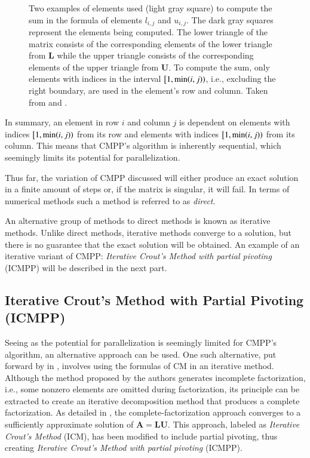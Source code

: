 \begin{figure}[ht!]
\begin{subfigure}{.5\textwidth}
		\label{Figure:theory->ICMPP->LUP->CMPP->sum-in-element-computation-dependance-U}
	\end{subfigure}
	\caption{Two examples of elements used (light gray square) to compute the sum in the formula of elements $l_{i,j}$ and $u_{i,j}$.
		The dark gray squares represent the elements being computed.
		The lower triangle of the matrix consists of the corresponding elements of the lower triangle from $\mathbf{L}$ while the upper triangle consists of the corresponding elements of the upper triangle from $\mathbf{U}$.
		To compute the sum, only elements with indices in the interval $\left[1, \minp{i, j}\right)$, i.e., excluding the right boundary, are used in the element's row and column.
		Taken from  \cite{Cejka2022} and  \cite{Chow2015}.
		}
	\label{Figure:theory->ICMPP->LUP->CMPP->sum-in-element-computation-dependance}
\end{figure}

In summary, an element in row $i$ and column $j$ is dependent on elements with indices $\left[1, \minp{i, j}\right)$ from its row and elements with indices $\left[1, \minp{i, j}\right)$ from its column.
This means that CMPP's algorithm is inherently sequential, which seemingly limits its potential for parallelization.

Thus far, the variation of CMPP discussed will either produce an exact solution in a finite amount of steps or, if the matrix is singular, it will fail.
In terms of numerical methods such a method is referred to as \textit{direct}.

An alternative group of methods to direct methods is known as iterative methods.
Unlike direct methods, iterative methods converge to a solution, but there is no guarantee that the exact solution will be obtained.
An example of an iterative variant of CMPP: \textit{Iterative Crout's Method with partial pivoting} (ICMPP) will be described in the next part.

\subsection{Iterative Crout's Method with Partial Pivoting (ICMPP)}\label{Subsection:theory->ICMPP->LUP->ICMPP}
Seeing as the potential for parallelization is seemingly limited for CMPP's algorithm, an alternative approach can be used.
One such alternative, put forward by  in  \cite{Anzt2019}, involves using the formulas of CM in an iterative method.
Although the method proposed by the authors generates incomplete factorization, i.e., some nonzero elements are omitted during factorization, its principle can be extracted to create an iterative decomposition method that produces a complete factorization.
As detailed in  \cite{Cejka2022}, the complete-factorization approach converges to a sufficiently approximate solution of $\mathbf{A} = \mathbf{LU}$.
This approach, labeled as \textit{Iterative Crout's Method} (ICM), has been modified to include partial pivoting, thus creating \textit{Iterative Crout's Method with partial pivoting} (ICMPP).


